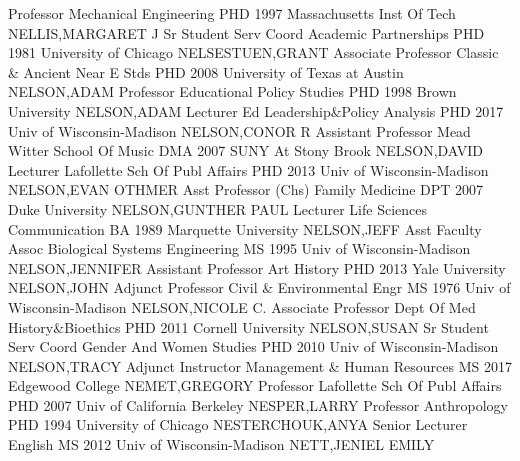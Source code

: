 \documentclass[
]{article}
\begin{document}
\textbar Professor \textbar Mechanical Engineering \textbar PHD 1997
Massachusetts Inst Of Tech \textbar NELLIS,MARGARET J \textbar{}
 \textbar Sr Student Serv Coord \textbar Academic
Partnerships \textbar PHD 1981 University of Chicago
\textbar NELSESTUEN,GRANT \textbar{}  \textbar Associate
Professor \textbar Classic \& Ancient Near E Stds \textbar PHD 2008
University of Texas at Austin \textbar NELSON,ADAM \textbar{}
 \textbar Professor \textbar Educational Policy Studies
\textbar PHD 1998 Brown University \textbar NELSON,ADAM \textbar{}
 \textbar Lecturer \textbar Ed Leadership\&Policy Analysis
\textbar PHD 2017 Univ of Wisconsin-Madison \textbar NELSON,CONOR R
\textbar{}  \textbar Assistant Professor \textbar Mead
Witter School Of Music \textbar DMA 2007 SUNY At Stony Brook
\textbar NELSON,DAVID \textbar{}  \textbar Lecturer
\textbar Lafollette Sch Of Publ Affairs \textbar PHD 2013 Univ of
Wisconsin-Madison \textbar NELSON,EVAN OTHMER \textbar{} 
\textbar Asst Professor (Chs) \textbar Family Medicine \textbar DPT 2007
Duke University \textbar NELSON,GUNTHER PAUL \textbar{} 
\textbar Lecturer \textbar Life Sciences Communication \textbar BA 1989
Marquette University \textbar NELSON,JEFF \textbar{} 
\textbar Asst Faculty Assoc \textbar Biological Systems Engineering
\textbar MS 1995 Univ of Wisconsin-Madison \textbar NELSON,JENNIFER
\textbar{}  \textbar Assistant Professor \textbar Art
History \textbar PHD 2013 Yale University \textbar NELSON,JOHN
\textbar{}  \textbar Adjunct Professor \textbar Civil \&
Environmental Engr \textbar MS 1976 Univ of Wisconsin-Madison
\textbar NELSON,NICOLE C. \textbar{}  \textbar Associate
Professor \textbar Dept Of Med History\&Bioethics \textbar PHD 2011
Cornell University \textbar NELSON,SUSAN \textbar{} 
\textbar Sr Student Serv Coord \textbar Gender And Women Studies
\textbar PHD 2010 Univ of Wisconsin-Madison \textbar NELSON,TRACY
\textbar{}  \textbar Adjunct Instructor \textbar Management
\& Human Resources \textbar MS 2017 Edgewood College
\textbar NEMET,GREGORY \textbar{}  \textbar Professor
\textbar Lafollette Sch Of Publ Affairs \textbar PHD 2007 Univ of
California Berkeley \textbar NESPER,LARRY \textbar{} 
\textbar Professor \textbar Anthropology \textbar PHD 1994 University of
Chicago \textbar NESTERCHOUK,ANYA \textbar{} 
\textbar Senior Lecturer \textbar English \textbar MS 2012 Univ of
Wisconsin-Madison \textbar NETT,JENIEL EMILY \textbar{} 
\end{document}
